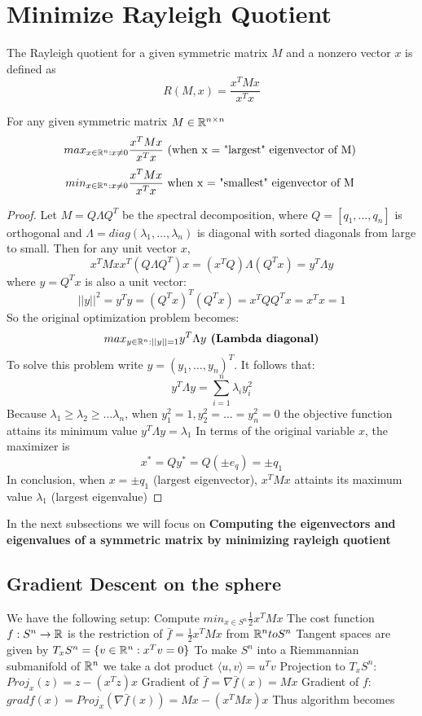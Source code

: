\documentclass[11pt,a4paper]{report}
\begin{document}
\chapter{Minimize Rayleigh Quotient}\label{RayChapter}
The Rayleigh quotient for a given symmetric matrix $M$ and a nonzero vector $x$ is defined as
$$ R(M,x) = \frac{x^T M x}{x^T x}$$
\begin{thm}
    For any given symmetric matrix $M \in \mathbb{R}^{n \times n}$
    $$ max_{x \in \mathbb{R}^{n}: x \neq 0} \frac{x^T M x}{x^T x} \text{ (when x = "largest" eigenvector of M) } $$
    $$ min_{x \in \mathbb{R}^{n}: x \neq 0} \frac{x^T M x}{x^T x} \text{ when x = "smallest" eigenvector of M } $$
    \begin{proof}        
        Let $M = Q \Lambda Q^T$ be the spectral decomposition, where $Q = [q_1, \dots, q_n]$ is orthogonal and 
        $\Lambda = diag(\lambda_1, \dots, \lambda_n) $ is diagonal with sorted diagonals from large to small.
        Then for any unit vector $x$,
        $$ x^T M x x^T (Q \Lambda Q^T) x = (x^T Q) \Lambda (Q^T x) = y^T \Lambda y $$
        where $y = Q^Tx$ is also a unit vector:
        $$ || y ||^2 = y^T y = (Q^T x)^T (Q^T x) = x^T Q Q^T x = x^T x = 1 $$
        So the original optimization problem becomes:
        $$ max_{y \in \mathbb{R}^n : || y || =1 } y^T \Lambda y \textbf{ (Lambda diagonal)}  $$
        To solve this problem write $y = (y_1, \dots, y_n)^T$. It follows that:
        $$ y^T \Lambda y = \sum_{i=1}^{n} \lambda_i y_i^2  $$
        Because $\lambda_1 \geq \lambda_2 \geq \dots \lambda_n$, when
        $y_1^2 = 1, y_2^2 = \dots = y_n^2 = 0$
        the objective function attains its minimum value $y^T \Lambda y = \lambda_1$
        In terms of the original variable $x$, the maximizer is
        $$ x^{*} = Qy^{*} = Q (\pm e_q) = \pm q_1 $$
        In conclusion, when $x=\pm q_1$ (largest eigenvector), $x^TMx$ attaints its maximum value $\lambda_1$ (largest eigenvalue)
    \end{proof}
\end{thm}
In the next subsections we will focus on \textbf{Computing the eigenvectors and eigenvalues of a symmetric matrix by minimizing rayleigh quotient}
\section{Gradient Descent on the sphere}
We have the following setup: \newline
Compute $ min_{x \in S^n} \frac{1}{2} x^T M x $ \newline
The cost function $f: S^n \to \mathbb{R}$ is the restriction of $\bar{f} = \frac{1}{2} x^T M x $ from $\mathbb{R}^n to S^n$ \newline 
Tangent spaces are given by $T_x S^n = \{ v \in \mathbb{R}^n : x^T v = 0 \}$ \newline
To make $S^n$ into a Riemmannian submanifold of $\mathbb{R}^n$ we take a dot product $\langle u, v \rangle = u^T v $ 
Projection to $T_x S^n$: $Proj_x(z) = z - (x^T z)x$ \newline
Gradient of $\bar{f} = \nabla \bar{f} (x) = M x$ \newline
Gradient of $f$: $grad f(x) = Proj_x(\nabla \bar{f} (x)) = Mx - (x^T M x) x$
Thus algorithm becomes
\end{document}
